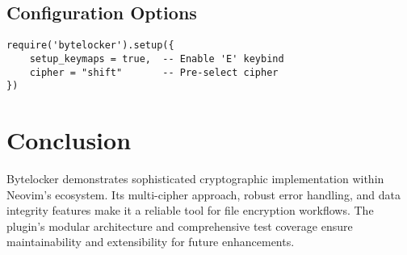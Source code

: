 \documentclass[11pt,a4paper]{article}
\begin{document}
\begin{multicols}{2}
\subsection{Configuration Options}
\begin{lstlisting}[basicstyle=\ttfamily\tiny]
require('bytelocker').setup({
    setup_keymaps = true,  -- Enable 'E' keybind
    cipher = "shift"       -- Pre-select cipher
})
\end{lstlisting}

\section{Conclusion}

Bytelocker demonstrates sophisticated cryptographic implementation within Neovim's ecosystem. Its multi-cipher approach, robust error handling, and data integrity features make it a reliable tool for file encryption workflows. The plugin's modular architecture and comprehensive test coverage ensure maintainability and extensibility for future enhancements.

\end{multicols}
\end{document}
